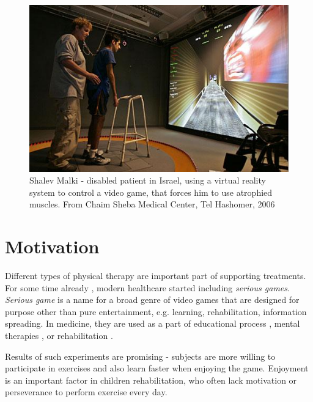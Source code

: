 \begin{figure}
\centering
\includegraphics[width=\textwidth]{../images/rehab_example.JPG} 
\caption{Shalev Malki - disabled patient in Israel, using a virtual reality system to control a video game, that forces him to use atrophied muscles. From Chaim Sheba Medical Center, Tel Hashomer, 2006}
\label{img:example}
\end{figure}


\section{Motivation}
Different types of physical therapy are important part of supporting treatments. For some time already \cite{rehabilitation}, modern healthcare started including \emph{serious games}. \emph{Serious game} is a name for a broad genre of video games that are designed for purpose other than pure entertainment, e.g. learning, rehabilitation, information spreading. In medicine, they are used as a part of educational process \cite{exercise}, mental therapies \cite{mental_game, mental}, or rehabilitation \cite{physical_rehab, stroke_rehab}. 

Results of such experiments are promising - subjects are more willing to participate in exercises and also learn faster when enjoying the game. Enjoyment is an important factor in children rehabilitation, who often lack motivation or perseverance to perform exercise every day. 

